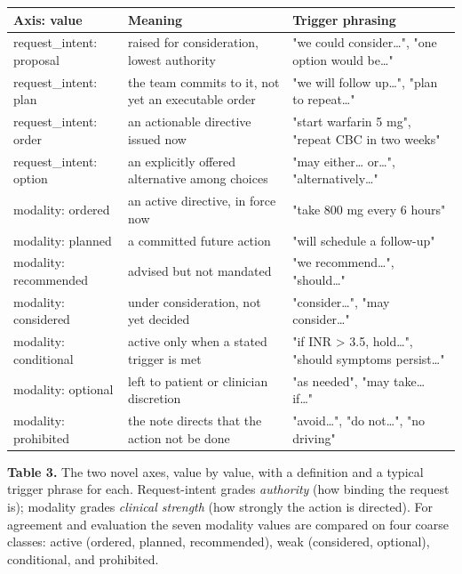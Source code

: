 \begin{table}[ht]
\centering
\small\setlength{\tabcolsep}{4pt}%
\setlength{\tabcolsep}{4pt}
\begin{tabularx}{\linewidth}{>{\hsize=0.726\hsize\raggedright\arraybackslash}X >{\hsize=1.158\hsize\raggedright\arraybackslash}X >{\hsize=1.116\hsize\raggedright\arraybackslash}X}
\toprule
Axis: value & Meaning & Trigger phrasing \\
\midrule
request\_\allowbreak{}intent: proposal & raised for consideration, lowest authority & "we could consider\ldots", "one option would be\ldots" \\
request\_\allowbreak{}intent: plan & the team commits to it, not yet an executable order & "we will follow up\ldots", "plan to repeat\ldots" \\
request\_\allowbreak{}intent: order & an actionable directive issued now & "start warfarin 5 mg", "repeat CBC in two weeks" \\
request\_\allowbreak{}intent: option & an explicitly offered alternative among choices & "may either\ldots{} or\ldots", "alternatively\ldots" \\
modality: ordered & an active directive, in force now & "take 800 mg every 6 hours" \\
modality: planned & a committed future action & "will schedule a follow-up" \\
modality: recommended & advised but not mandated & "we recommend\ldots", "should\ldots" \\
modality: considered & under consideration, not yet decided & "consider\ldots", "may consider\ldots" \\
modality: conditional & active only when a stated trigger is met & "if INR \textgreater{} 3.5, hold\ldots", "should symptoms persist\ldots" \\
modality: optional & left to patient or clinician discretion & "as needed", "may take\ldots{} if\ldots" \\
modality: prohibited & the note directs that the action not be done & "avoid\ldots", "do not\ldots", "no driving" \\
\bottomrule
\end{tabularx}
\end{table}

\textbf{Table 3.} The two novel axes, value by value, with a definition and a typical trigger phrase for each. Request-intent grades \emph{authority} (how binding the request is); modality grades \emph{clinical strength} (how strongly the action is directed). For agreement and evaluation the seven modality values are compared on four coarse classes: active (ordered, planned, recommended), weak (considered, optional), conditional, and prohibited.

